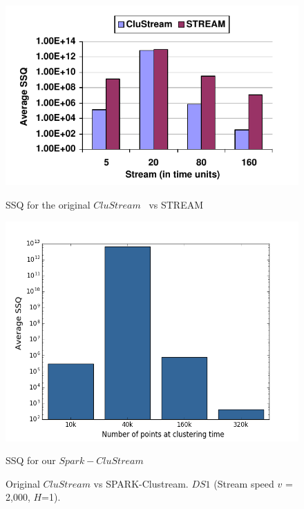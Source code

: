     \begin{figure}[!ht]
        \begin{minipage}[l]{1.0\columnwidth}
            \centering
             \includegraphics[width=0.9\columnwidth]{./styles/2000h1-orig.png}
            \caption{SSQ for the original $CluStream$~\cite{clustreamOrig} vs STREAM~\cite{}}\label{fig:2000orig}
        \end{minipage}
        \hfill{}
        \begin{minipage}[r]{1.0\columnwidth}
            \centering
            \includegraphics[width=0.9\columnwidth]{./styles/2000h1.png}
            \caption{SSQ for our $Spark-CluStream$}\label{fig:2000}
        \end{minipage}
        \captionsetup{labelformat=empty}
        \caption{Original $CluStream$ vs SPARK-Clustream.  $DS1$ (Stream speed $v$ = 2,000, $H$=1).}
        \label{fig:DS1quality}
    \end{figure}
    



